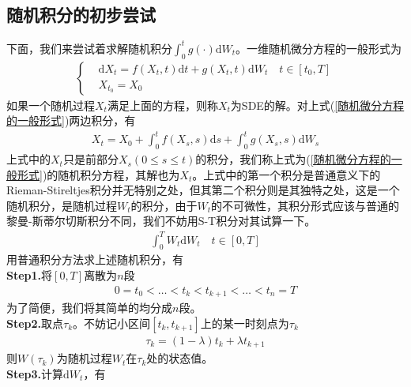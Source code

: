     \subsection{随机积分的初步尝试}
        \label{subsec:随机积分的初步尝试}
        \par
        下面，我们来尝试着求解随机积分$\int_0^t g(\cdot) \mathrm{d}W_t$。一维随机微分方程的一般形式为
        \begin{align}
            \label{随机微分方程的一般形式}
            \left\{
                \begin{aligned}
                        &\mathrm{d}X_t = f(X_t,t)\mathrm{d}t + g(X_t,t)\mathrm{d}W_t \quad t\in [t_0,T]\\
                        &X_{t_0} = X_0
                \end{aligned}
            \right.
        \end{align}
        如果一个随机过程$X_t$满足上面的方程，则称$X_t$为SDE的解。对上式(\ref{随机微分方程的一般形式})两边积分，有
        \begin{align*}
            X_t = X_0 + \int_0 ^t f(X_s,s) \mathrm{d}s + \int_0 ^t g(X_s,s)\mathrm{d}W_s
        \end{align*}
        上式中的$X_t$只是前部分$X_s(0 \leqslant s \leqslant t)$的积分，我们称上式为(\ref{随机微分方程的一般形式})的随机积分方程，其解也为$X_t$。上式中的第一个积分是普通意义下的Rieman-Stireltjes积分并无特别之处，但其第二个积分则是其独特之处，这是一个随机积分，是随机过程$W_t$的积分，由于$W_t$的不可微性，其积分形式应该与普通的黎曼-斯蒂尔切斯积分不同，我们不妨用S-T积分对其试算一下。
        \begin{align*}
            \int_0 ^T W_t \mathrm{d}W_t \quad t\in [0,T]
        \end{align*}
        用普通积分方法求上述随机积分，有\\
        \textbf{Step1.}将$[0,T]$离散为$n$段
        \begin{align*}
            0 = t_0 <\dots <t_k<t_{k+1}<\dots<t_n = T
        \end{align*}
        为了简便，我们将其简单的均分成$n$段。\\
        \textbf{Step2.}取点$\tau_k$。不妨记小区间$[t_k, t_{k+1}]$上的某一时刻点为$\tau_k$
        \begin{align*}
            \tau_k = (1- \lambda) t_k +\lambda t_{k+1}
        \end{align*}
        则$W(\tau_k)$为随机过程$W_t$在$\tau_k$处的状态值。\\
        \textbf{Step3.}计算$\mathrm{d}W_t$，有
